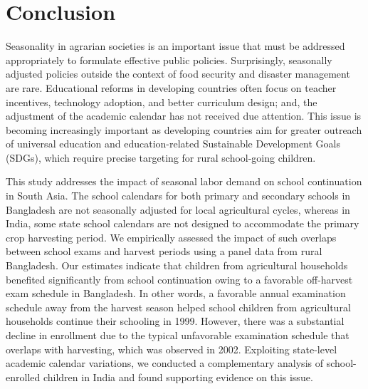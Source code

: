 \documentclass[12pt,letterpaper]{article}
\newcommand{\0}{\ensuremath{\mbox{\boldmath $0$}}}
\begin{document}
\section{Conclusion}


Seasonality in agrarian societies is an important issue that must be addressed appropriately to formulate effective public policies. Surprisingly, seasonally adjusted policies outside the context of food security and disaster management are rare. Educational reforms in developing countries often focus on teacher incentives, technology adoption, and better curriculum design; and, the adjustment of the academic calendar has not received due attention. This issue is becoming increasingly important as developing countries aim for greater outreach of universal education and education-related Sustainable Development Goals (SDGs), which require precise targeting for rural school-going children.

This study addresses the impact of seasonal labor demand on school continuation in South Asia. The school calendars for both primary and secondary schools in Bangladesh are not seasonally adjusted for local agricultural cycles, whereas in India, some state school calendars are not designed to accommodate the primary crop harvesting period. We empirically assessed the impact of such overlaps between school exams and harvest periods using a panel data from rural Bangladesh. Our estimates indicate that children from agricultural households benefited significantly from school continuation owing to a favorable off-harvest exam schedule in Bangladesh. In other words, a favorable annual examination schedule away from the harvest season helped school children from agricultural households continue their schooling in 1999. However, there was a substantial decline in enrollment due to the typical unfavorable examination schedule that overlaps with harvesting, which was observed in 2002. Exploiting state-level academic calendar variations, we conducted a complementary analysis of school-enrolled children in India and found supporting evidence on this issue.
\end{document}
